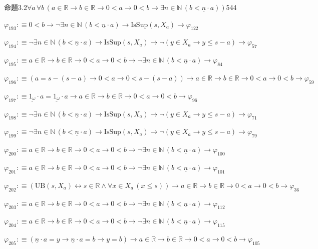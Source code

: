 \begin{fullproof}{命題3.2}{$\forall a\,\forall b\,(a \in \mathbb{R} \to b \in \mathbb{R} \to 0 < a \to 0 < b \to \exists n \in \mathbb{N}\,(b < \underline{n} \cdot a))$}{544}
\begin{abbrevlist}
\item $\varphi_{193} :\equiv 0 < b \to \neg \exists n \in \mathbb{N}\,(b < \underline{n} \cdot a) \to \mathrm{IsSup}(s,X_{a}) \to \varphi_{122}$
\item $\varphi_{194} :\equiv \neg \exists n \in \mathbb{N}\,(b < \underline{n} \cdot a) \to \mathrm{IsSup}(s,X_{a}) \to \neg (y \in X_{a} \to y \leq s - a) \to \varphi_{57}$
\item $\varphi_{195} :\equiv a \in \mathbb{R} \to b \in \mathbb{R} \to 0 < a \to 0 < b \to \neg \exists n \in \mathbb{N}\,(b < \underline{n} \cdot a) \to \varphi_{84}$
\item $\varphi_{196} :\equiv (a = s - (s - a) \to 0 < a \to 0 < s - (s - a)) \to a \in \mathbb{R} \to b \in \mathbb{R} \to 0 < a \to 0 < b \to \varphi_{59}$
\item $\varphi_{197} :\equiv \underline{1_{\omega}} \cdot a = \underline{1_{\omega}} \cdot a \to a \in \mathbb{R} \to b \in \mathbb{R} \to 0 < a \to 0 < b \to \varphi_{96}$
\item $\varphi_{198} :\equiv \neg \exists n \in \mathbb{N}\,(b < \underline{n} \cdot a) \to \mathrm{IsSup}(s,X_{a}) \to \neg (y \in X_{a} \to y \leq s - a) \to \varphi_{71}$
\item $\varphi_{199} :\equiv \neg \exists n \in \mathbb{N}\,(b < \underline{n} \cdot a) \to \mathrm{IsSup}(s,X_{a}) \to \neg (y \in X_{a} \to y \leq s - a) \to \varphi_{79}$
\item $\varphi_{200} :\equiv a \in \mathbb{R} \to b \in \mathbb{R} \to 0 < a \to 0 < b \to \neg \exists n \in \mathbb{N}\,(b < \underline{n} \cdot a) \to \varphi_{100}$
\item $\varphi_{201} :\equiv a \in \mathbb{R} \to b \in \mathbb{R} \to 0 < a \to 0 < b \to \neg \exists n \in \mathbb{N}\,(b < \underline{n} \cdot a) \to \varphi_{101}$
\item $\varphi_{202} :\equiv (\mathrm{UB}(s,X_{a}) \leftrightarrow s \in \mathbb{R} \land \forall x \in X_{a}\,(x \leq s)) \to a \in \mathbb{R} \to b \in \mathbb{R} \to 0 < a \to 0 < b \to \varphi_{36}$
\item $\varphi_{203} :\equiv a \in \mathbb{R} \to b \in \mathbb{R} \to 0 < a \to 0 < b \to \neg \exists n \in \mathbb{N}\,(b < \underline{n} \cdot a) \to \varphi_{112}$
\item $\varphi_{204} :\equiv a \in \mathbb{R} \to b \in \mathbb{R} \to 0 < a \to 0 < b \to \neg \exists n \in \mathbb{N}\,(b < \underline{n} \cdot a) \to \varphi_{115}$
\item $\varphi_{205} :\equiv (\underline{n} \cdot a = y \to \underline{n} \cdot a = b \to y = b) \to a \in \mathbb{R} \to b \in \mathbb{R} \to 0 < a \to 0 < b \to \varphi_{105}$

\end{abbrevlist}
\end{fullproof}
